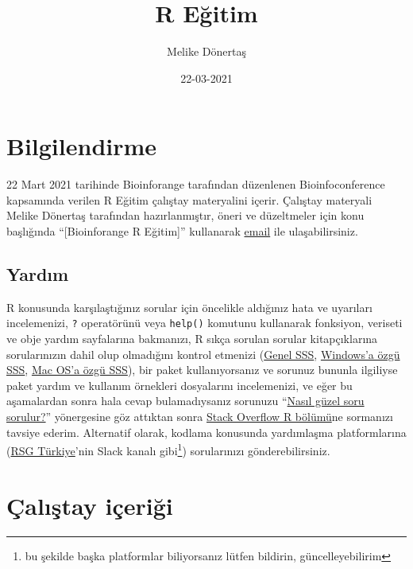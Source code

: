 \documentclass[
]{book}
\title{R Eğitim}
\author{Melike Dönertaş}
\date{22-03-2021}
\begin{document}
\maketitle

{
\setcounter{tocdepth}{1}
\tableofcontents
}
\hypertarget{bilgilendirme}{%
\chapter*{Bilgilendirme}\label{bilgilendirme}}

22 Mart 2021 tarihinde Bioinforange tarafından düzenlenen Bioinfoconference kapsamında verilen R Eğitim çalıştay materyalini içerir. Çalıştay materyali Melike Dönertaş tarafından hazırlanmıştır, öneri ve düzeltmeler için konu başlığında ``{[}Bioinforange R Eğitim{]}'' kullanarak \href{mailto:donertas.melike@gmail.com}{email} ile ulaşabilirsiniz.

\hypertarget{yardux131m}{%
\section*{Yardım}\label{yardux131m}}

R konusunda karşılaştığınız sorular için öncelikle aldığınız hata ve uyarıları incelemenizi, \texttt{?} operatörünü veya \texttt{help()} komutunu kullanarak fonksiyon, veriseti ve obje yardım sayfalarına bakmanızı, R sıkça sorulan sorular kitapçıklarına sorularınızın dahil olup olmadığını kontrol etmenizi (\href{https://cran.r-project.org/doc/FAQ/R-FAQ.html}{Genel SSS}, \href{https://cran.r-project.org/bin/windows/base/rw-FAQ.html}{Windows'a özgü SSS}, \href{https://cran.r-project.org/bin/macosx/RMacOSX-FAQ.html}{Mac OS'a özgü SSS}), bir paket kullanıyorsanız ve sorunuz bununla ilgiliyse paket yardım ve kullanım örnekleri dosyalarını incelemenizi, ve eğer bu aşamalardan sonra hala cevap bulamadıysanız sorunuzu ``\href{https://stackoverflow.com/help/how-to-ask}{Nasıl güzel soru sorulur?}'' yönergesine göz attıktan sonra \href{https://stackoverflow.com/questions/tagged/r}{Stack Overflow R bölümü}ne sormanızı tavsiye ederim. Alternatif olarak, kodlama konusunda yardımlaşma platformlarına (\href{https://rsgturkey.com/}{RSG Türkiye}'nin Slack kanalı gibi\footnote{bu şekilde başka platformlar biliyorsanız lütfen bildirin, güncelleyebilirim}) sorularınızı gönderebilirsiniz.

\hypertarget{uxe7alux131ux15ftay-iuxe7eriux11fi}{%
\chapter{Çalıştay içeriği}\label{uxe7alux131ux15ftay-iuxe7eriux11fi}}
\end{document}
